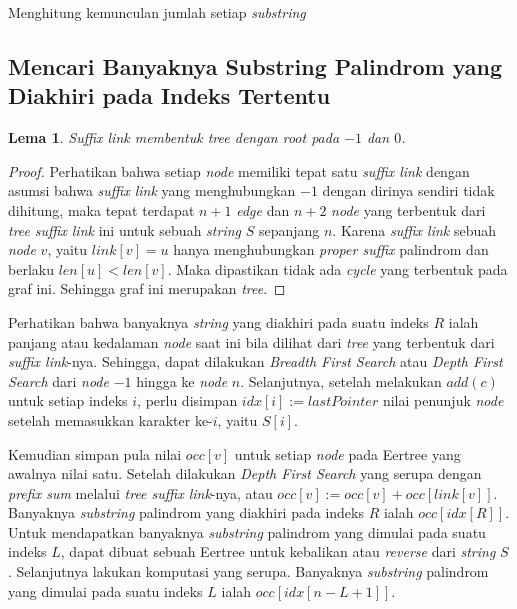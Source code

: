 \documentclass[11pt, a4paper, final]{article}
\newtheorem{lemma}[theorem]{Lema}
\begin{document}
\begin{algorithm}
\DontPrintSemicolon
\caption{Menghitung kemunculan jumlah setiap \textit{substring}}\label{alg:occ_sub}

\end{algorithm}

\subsection{Mencari Banyaknya Substring Palindrom yang Diakhiri pada Indeks Tertentu}

\begin{lemma}
\textit{Suffix link} membentuk tree dengan root pada $-1$ dan $0$.
\end{lemma}

\begin{proof}

Perhatikan bahwa setiap \textit{node} memiliki tepat satu \textit{suffix link} dengan asumsi bahwa \textit{suffix link} yang menghubungkan $-1$ dengan dirinya sendiri tidak dihitung, maka tepat terdapat $n + 1$ \textit{edge} dan $n + 2$ \textit{node} yang terbentuk dari \textit{tree} \textit{suffix link} ini untuk sebuah \textit{string} $S$ sepanjang $n$. Karena \textit{suffix link} sebuah \textit{node} $v$, yaitu $link[v] = u$ hanya menghubungkan \textit{proper suffix} palindrom dan berlaku $len[u] < len[v]$. Maka dipastikan tidak ada \textit{cycle} yang terbentuk pada graf ini. Sehingga graf ini merupakan \textit{tree}.
\end{proof}

Perhatikan bahwa banyaknya \textit{string} yang diakhiri pada suatu indeks $R$ ialah panjang atau kedalaman \textit{node} saat ini bila dilihat dari \textit{tree} yang terbentuk dari \textit{suffix link}-nya. Sehingga, dapat dilakukan \textit{Breadth First Search} atau \textit{Depth First Search} dari \textit{node} $-1$ hingga ke \textit{node} $n$. Selanjutnya, setelah melakukan $add(c)$ untuk setiap indeks $i$, perlu disimpan $idx[i] := lastPointer$ nilai penunjuk \textit{node} setelah memasukkan karakter ke-$i$, yaitu $S[i]$. 

Kemudian simpan pula nilai $occ[v]$ untuk setiap \textit{node} pada Eertree yang awalnya nilai satu. Setelah dilakukan \textit{Depth First Search} yang serupa dengan \textit{prefix sum} melalui \textit{tree suffix link}-nya, atau $occ[v] := occ[v] + occ[link[v]]$. Banyaknya \textit{substring} palindrom yang diakhiri pada indeks $R$ ialah $occ[idx[R]]$. Untuk mendapatkan banyaknya \textit{substring} palindrom yang dimulai pada suatu indeks $L$, dapat dibuat sebuah Eertree untuk kebalikan atau \textit{reverse} dari \textit{string} $S$. Selanjutnya lakukan komputasi yang serupa. Banyaknya \textit{substring} palindrom yang dimulai pada suatu indeks $L$ ialah $occ[idx[n - L + 1]]$.
\end{document}
